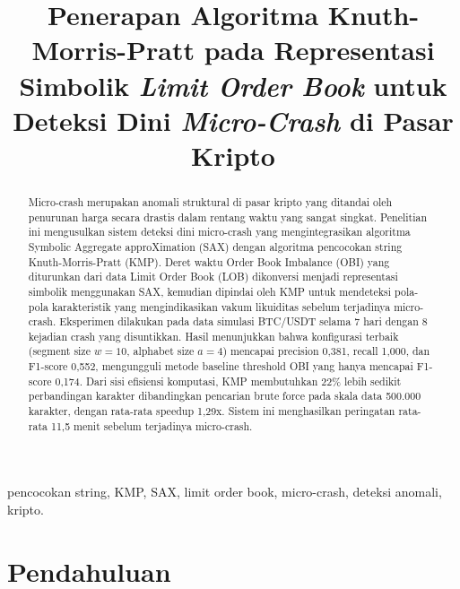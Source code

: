 \documentclass[conference]{IEEEtran}
\begin{document}
\title{Penerapan Algoritma Knuth-Morris-Pratt pada Representasi Simbolik \textit{Limit Order Book} untuk Deteksi Dini \textit{Micro-Crash} di Pasar Kripto}

\author{
}

\maketitle
\thispagestyle{fancy}

\begin{abstract}
Micro-crash merupakan anomali struktural di pasar kripto yang ditandai oleh penurunan harga secara drastis dalam rentang waktu yang sangat singkat. Penelitian ini mengusulkan sistem deteksi dini micro-crash yang mengintegrasikan algoritma Symbolic Aggregate approXimation (SAX) dengan algoritma pencocokan string Knuth-Morris-Pratt (KMP). Deret waktu Order Book Imbalance (OBI) yang diturunkan dari data Limit Order Book (LOB) dikonversi menjadi representasi simbolik menggunakan SAX, kemudian dipindai oleh KMP untuk mendeteksi pola-pola karakteristik yang mengindikasikan vakum likuiditas sebelum terjadinya micro-crash. Eksperimen dilakukan pada data simulasi BTC/USDT selama 7 hari dengan 8 kejadian crash yang disuntikkan. Hasil menunjukkan bahwa konfigurasi terbaik (segment size $w{=}10$, alphabet size $a{=}4$) mencapai precision 0,381, recall 1,000, dan F1-score 0,552, mengungguli metode baseline threshold OBI yang hanya mencapai F1-score 0,174. Dari sisi efisiensi komputasi, KMP membutuhkan 22\% lebih sedikit perbandingan karakter dibandingkan pencarian brute force pada skala data 500.000 karakter, dengan rata-rata speedup 1,29x. Sistem ini menghasilkan peringatan rata-rata 11,5 menit sebelum terjadinya micro-crash.
\end{abstract}

\begin{IEEEkeywords}
pencocokan string, KMP, SAX, limit order book, micro-crash, deteksi anomali, kripto.
\end{IEEEkeywords}

\section{Pendahuluan}
\end{document}
